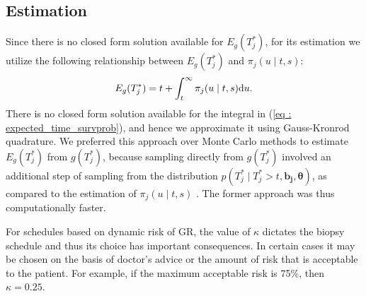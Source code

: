 
\subsection{Estimation}
Since there is no closed form solution available for $E_g(T^*_j)$, for its estimation we utilize the following relationship between $E_g(T^*_j)$ and $\pi_j(u \mid t, s)$:
\begin{equation}
\label{eq : expected_time_survprob}
E_g(T^*_j) = t + \int_t^\infty \pi_j(u \mid t, s) \rmn{d} u.
\end{equation}
There is no closed form solution available for the integral in (\ref{eq : expected_time_survprob}), and hence we approximate it using Gauss-Kronrod quadrature. We preferred this approach over Monte Carlo methods to estimate $E_g(T^*_j)$ from $g(T^*_j)$, because sampling directly from $g(T^*_j)$ involved an additional step of sampling from the distribution $p(T^*_j \mid T^*_j > t, \boldsymbol{b_j}, \boldsymbol{\theta})$, as compared to the estimation of $\pi_j(u \mid t, s)$ \citep{rizopoulos2011dynamic}. The former approach was thus computationally faster. 


For schedules based on dynamic risk of GR, the value of $\kappa$ dictates the biopsy schedule and thus its choice has important consequences. In certain cases it may be chosen on the basis of doctor's advice or the amount of risk that is acceptable to the patient. For example, if the maximum acceptable risk is 75\%, then $\kappa = 0.25$.

